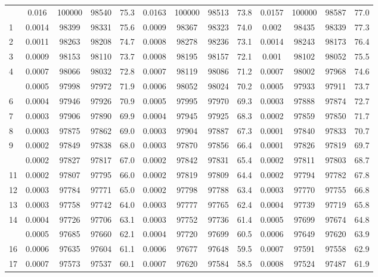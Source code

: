 \documentclass[
  14pt,
]{article}
\begin{document}
\begin{longtable}[t]{lcccccccccccc}
\endfoot
\bottomrule
\endlastfoot
0 & 0.016 & 100000 & 98540 & 75.3 & 0.0163 & 100000 & 98513 & 73.8 & 0.0157 & 100000 & 98587 & 77.0\\
1 & 0.0014 & 98399 & 98331 & 75.6 & 0.0009 & 98367 & 98323 & 74.0 & 0.002 & 98435 & 98339 & 77.3\\
2 & 0.0011 & 98263 & 98208 & 74.7 & 0.0008 & 98278 & 98236 & 73.1 & 0.0014 & 98243 & 98173 & 76.4\\
3 & 0.0009 & 98153 & 98110 & 73.7 & 0.0008 & 98195 & 98157 & 72.1 & 0.001 & 98102 & 98052 & 75.5\\
4 & 0.0007 & 98066 & 98032 & 72.8 & 0.0007 & 98119 & 98086 & 71.2 & 0.0007 & 98002 & 97968 & 74.6\\
\addlinespace
5 & 0.0005 & 97998 & 97972 & 71.9 & 0.0006 & 98052 & 98024 & 70.2 & 0.0005 & 97933 & 97911 & 73.7\\
6 & 0.0004 & 97946 & 97926 & 70.9 & 0.0005 & 97995 & 97970 & 69.3 & 0.0003 & 97888 & 97874 & 72.7\\
7 & 0.0003 & 97906 & 97890 & 69.9 & 0.0004 & 97945 & 97925 & 68.3 & 0.0002 & 97859 & 97850 & 71.7\\
8 & 0.0003 & 97875 & 97862 & 69.0 & 0.0003 & 97904 & 97887 & 67.3 & 0.0001 & 97840 & 97833 & 70.7\\
9 & 0.0002 & 97849 & 97838 & 68.0 & 0.0003 & 97870 & 97856 & 66.4 & 0.0001 & 97826 & 97819 & 69.7\\
\addlinespace
10 & 0.0002 & 97827 & 97817 & 67.0 & 0.0002 & 97842 & 97831 & 65.4 & 0.0002 & 97811 & 97803 & 68.7\\
11 & 0.0002 & 97807 & 97795 & 66.0 & 0.0002 & 97819 & 97809 & 64.4 & 0.0002 & 97794 & 97782 & 67.8\\
12 & 0.0003 & 97784 & 97771 & 65.0 & 0.0002 & 97798 & 97788 & 63.4 & 0.0003 & 97770 & 97755 & 66.8\\
13 & 0.0003 & 97758 & 97742 & 64.0 & 0.0003 & 97777 & 97765 & 62.4 & 0.0004 & 97739 & 97719 & 65.8\\
14 & 0.0004 & 97726 & 97706 & 63.1 & 0.0003 & 97752 & 97736 & 61.4 & 0.0005 & 97699 & 97674 & 64.8\\
\addlinespace
15 & 0.0005 & 97685 & 97660 & 62.1 & 0.0004 & 97720 & 97699 & 60.5 & 0.0006 & 97649 & 97620 & 63.9\\
16 & 0.0006 & 97635 & 97604 & 61.1 & 0.0006 & 97677 & 97648 & 59.5 & 0.0007 & 97591 & 97558 & 62.9\\
17 & 0.0007 & 97573 & 97537 & 60.1 & 0.0007 & 97620 & 97584 & 58.5 & 0.0008 & 97524 & 97487 & 61.9\\

\end{longtable}
\end{document}
